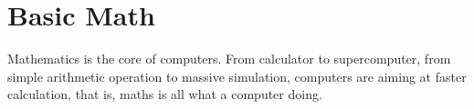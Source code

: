 \documentclass[../build/book.tex]{subfiles}
\begin{document}
\chapter{Basic Math}

Mathematics is the core of computers. From calculator to supercomputer, from simple arithmetic operation to massive simulation, computers are aiming at faster calculation, that is, maths is all what a computer doing.
\end{document}
